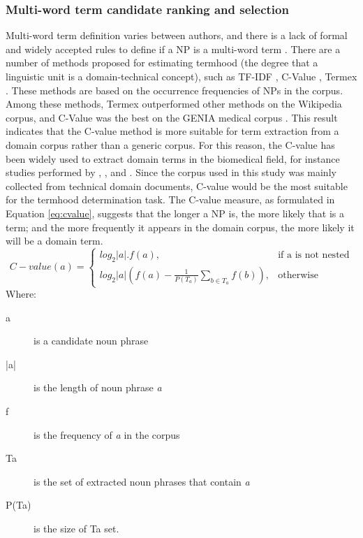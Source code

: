 \documentclass[Journal,InsideFigs, DoubleSpace]{ascelike} %
\begin{document}
\subsubsection{Multi-word term candidate ranking and selection} 
%
Multi-word term definition varies between authors, and there is a lack of formal and widely accepted rules to define if a NP is a multi-word term \cite{frantzi20}. There are a number of methods proposed for estimating termhood (the degree that a linguistic unit is a domain-technical concept), such as TF-IDF  \cite{sparck72,salton88}, C-Value \cite{frantzi20}, Termex  \cite{sclano07}. These methods are based on the occurrence frequencies of NPs in the corpus. Among these methods, Termex outperformed other methods on the Wikipedia corpus, and C-Value was the best on the GENIA medical corpus \cite{zhang08}. This result indicates that the C-value method is more suitable for term extraction from a domain corpus rather than a generic corpus. For this reason, the C-value has been widely used to extract domain terms in the biomedical field, for instance studies performed by , , and . Since the corpus used in this study was mainly collected from technical domain documents, C-value would be the most suitable for the termhood determination task. The C-value measure, as formulated in Equation \ref{eq:cvalue}, suggests that the longer a NP is, the more likely that is a term; and the more frequently it appears in the domain corpus, the more likely it will be a domain term.
	\begin{equation}
	C-value(a)=
	\begin{cases}
	log_2|a|.f(a), & \text{if a is not nested} \\
	log_2|a|(f(a)-\frac{1}{P(T_a)}\sum_{b\in T_a} f(b)), & \text{otherwise}
	\end{cases}
	\label{eq:cvalue}
	\end{equation}
	Where:
	\begin{description}
		\item[a] is a candidate noun phrase
		\item[|a|] is the length of noun phrase \textit{a}
		\item[f] is the frequency of \textit{a} in the corpus
		\item[Ta] is the set of extracted noun phrases that contain \textit{a}
		\item[P(Ta)] is the size of Ta set.
	\end{description}
\end{document}
